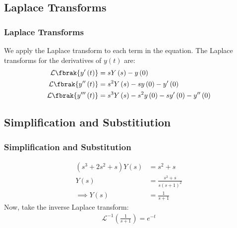 \documentclass{beamer}
\providecommand{\brak}[1]{\ensuremath{\left(#1\right)}}
\theoremstyle{remark}
\numberwithin{equation}{section}
\begin{document}
\subsection{Laplace Transforms}
\begin{frame}
\frametitle{Laplace Transforms}
We apply the Laplace transform to each term in the equation. The Laplace transforms for the derivatives of $y\brak{t}$ are:
\begin{align}
\mathcal{L}\fbrak{y^{\prime}\brak{t}} &= sY\brak{s} - y\brak{0} \\
\mathcal{L}\fbrak{y^{\prime\prime}\brak{t}} &= s^2Y\brak{s} - sy\brak{0} - y^{\prime}\brak{0} \\
\mathcal{L}\fbrak{y^{\prime\prime\prime}\brak{t}} &= s^3Y\brak{s} - s^2 y\brak{0} - sy^{\prime}\brak{0} - y^{\prime\prime}\brak{0}
\end{align}
\end{frame}
\subsection{Simplification and Substitiution}
\begin{frame}
\frametitle{Simplification and Substitution}
\begin{align}
\brak{s^3 + 2s^2 + s} Y\brak{s} &= s^2 + s \\
Y\brak{s} &= \frac{s^2 + s}{s(s+1)^2}\\
\implies Y\brak{s} &= \frac{1}{s + 1}
\end{align}
Now, take the inverse Laplace transform:
\begin{align}
\mathcal{L}^{-1}\brak{\frac{1}{s + 1}} = e^{-t}
\end{align}
\end{frame}
\end{document}
